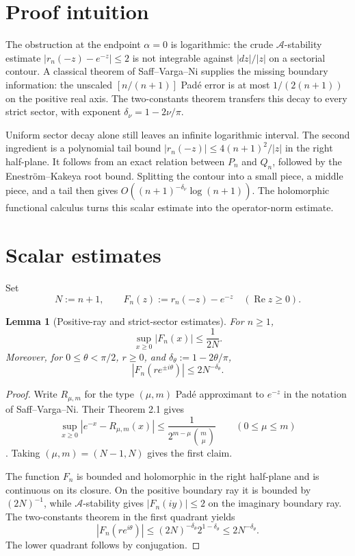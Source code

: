 \documentclass[11pt]{article}
\newtheorem{lemma}[theorem]{Lemma}
\begin{document}
\section{Proof intuition}
The obstruction at the endpoint $\alpha=0$ is logarithmic: the crude
$\mathcal A$-stability estimate $|r_n(-z)-e^{-z}|\leq2$ is not integrable
against $|dz|/|z|$ on a sectorial contour. A classical theorem of
Saff--Varga--Ni supplies the missing boundary information: the unscaled
$[n/(n+1)]$ Pad\'e error is at most $1/(2(n+1))$ on the positive real axis.
The two-constants theorem transfers this decay to every strict sector, with
exponent $\delta_\nu=1-2\nu/\pi$.

Uniform sector decay alone still leaves an infinite logarithmic interval.
The second ingredient is a polynomial tail bound
$|r_n(-z)|\leq4(n+1)^2/|z|$ in the right half-plane. It follows from an exact
relation between $P_n$ and $Q_n$, followed by the Enestr\"om--Kakeya root
bound. Splitting the contour into a small piece, a middle piece, and a tail
then gives $O((n+1)^{-\delta_\nu}\log(n+1))$. The holomorphic functional
calculus turns this scalar estimate into the operator-norm estimate.

\section{Scalar estimates}
Set
\[
 N:=n+1,\qquad F_n(z):=r_n(-z)-e^{-z}
 \quad (\operatorname{Re}z\geq0).
\]

\begin{lemma}[Positive-ray and strict-sector estimates]\label{lem:sector}
For $n\geq1$,
\[
 \sup_{x\geq0}|F_n(x)|\leq\frac1{2N}.
\]
Moreover, for $0\leq\theta<\pi/2$, $r\geq0$, and
$\delta_\theta:=1-2\theta/\pi$,
\[
 |F_n(re^{\pm i\theta})|\leq 2N^{-\delta_\theta}.
\]
\end{lemma}
\begin{proof}
Write $R_{\mu,m}$ for the type $(\mu,m)$ Pad\'e approximant to $e^{-z}$ in
the notation of Saff--Varga--Ni. Their Theorem 2.1 gives
\[
 \sup_{x\geq0}|e^{-x}-R_{\mu,m}(x)|
 \leq \frac1{2^{m-\mu}\binom m\mu}
 \qquad(0\leq\mu\leq m)
\]
\cite[Theorem 2.1]{SaffVargaNi}. Taking $(\mu,m)=(N-1,N)$ gives the first
claim.

The function $F_n$ is bounded and holomorphic in the right half-plane and is
continuous on its closure. On the positive boundary ray it is bounded by
$(2N)^{-1}$, while $\mathcal A$-stability gives $|F_n(iy)|\leq2$ on the
imaginary boundary ray. The two-constants theorem in the first quadrant yields
\[
 |F_n(re^{i\theta})|
 \leq (2N)^{-\delta_\theta}2^{1-\delta_\theta}
 \leq2N^{-\delta_\theta}.
\]
The lower quadrant follows by conjugation.
\end{proof}
\end{document}
